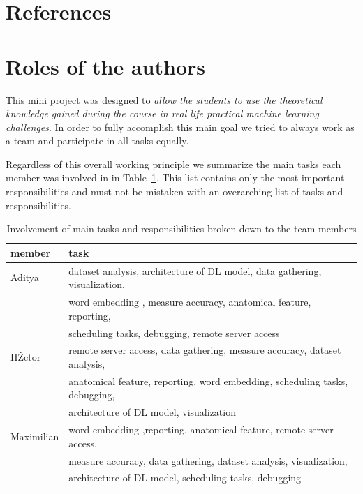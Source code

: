 \documentclass[a4paper,11pt]{article}
\begin{document}

\section{References}

{}



\section{Roles of the authors}

This mini project was designed to \textit{allow the students to use the theoretical knowledge gained during the course in real life practical machine learning challenges}. In order to fully accomplish this main goal we tried to always work as a team and participate in all tasks equally.

Regardless of this overall working principle we summarize the main tasks each member was involved in in Table~\ref{tab:roles}. This list contains only the most important responsibilities and must not be mistaken with an overarching list of tasks and responsibilities.

\begin{table}[h!]
\centering
 \begin{tabular}{l |l}
 member 		& task \\ \hline
 Aditya		&  dataset analysis, architecture of DL model, data gathering, visualization, \\ 
 			& word embedding , measure accuracy, anatomical feature, reporting,  \\
			& scheduling tasks, debugging, remote server access\\ \hline
 HŽctor 		&  remote server access, data gathering, measure accuracy, dataset analysis,\\
 			& anatomical feature, reporting, word embedding, scheduling tasks, debugging, \\
			& architecture of DL model, visualization\\ \hline
 Maximilian 	& word embedding ,reporting, anatomical feature, remote server access,\\
 			& measure accuracy, data gathering, dataset analysis, visualization, \\
			& architecture of DL model, scheduling tasks, debugging
 \end{tabular}
 \captionsetup{justification=centering,margin=2cm}
 \caption{Involvement of main tasks and responsibilities broken down to the team members}
 \label{tab:roles}
\end{table}

\end{document}
